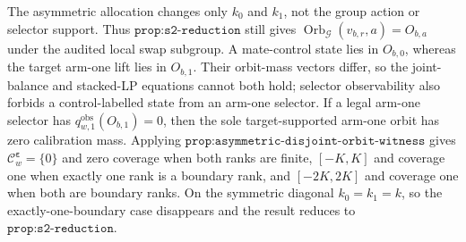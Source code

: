 The asymmetric allocation changes only \(k_0\) and \(k_1\), not the group action or selector support. Thus \(\texttt{prop:s2-reduction}\) still gives \(\operatorname{Orb}_{\mathcal G}(v_{b,r},a)=O_{b,a}\) under the audited local swap subgroup. A mate-control state lies in \(O_{b,0}\), whereas the target arm-one lift lies in \(O_{b,1}\). Their orbit-mass vectors differ, so the joint-balance and stacked-LP equations cannot both hold; selector observability also forbids a control-labelled state from an arm-one selector. If a legal arm-one selector has \(q^{\mathrm{obs}}_{w,1}(O_{b,1})=0\), then the sole target-supported arm-one orbit has zero calibration mass. Applying \(\texttt{prop:asymmetric-disjoint-orbit-witness}\) gives \(\mathcal C^{\boldsymbol\varepsilon}_w=\{0\}\) and zero coverage when both ranks are finite, \([-K,K]\) and coverage one when exactly one rank is a boundary rank, and \([-2K,2K]\) and coverage one when both are boundary ranks. On the symmetric diagonal \(k_0=k_1=k\), so the exactly-one-boundary case disappears and the result reduces to \(\texttt{prop:s2-reduction}\).
